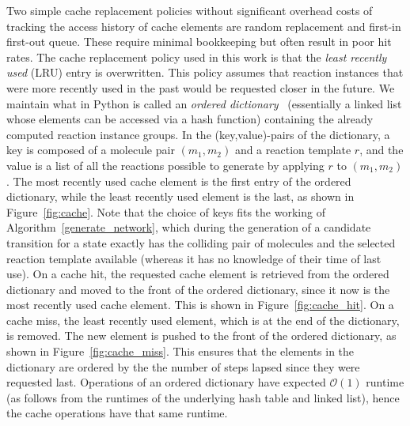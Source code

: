Two simple cache replacement policies without significant overhead costs of tracking the access history of cache elements are random replacement and first-in first-out queue. These require minimal bookkeeping but often result in poor hit rates. The cache replacement policy used in this work is that the \emph{least recently used} (LRU) entry is overwritten. This policy assumes that reaction instances that were more recently used in the past would be requested closer in the future. We maintain what in Python is called an \emph{ordered dictionary}~\cite{ordered_dict_py} (essentially a linked list whose elements can be accessed via a hash function) containing the already computed reaction instance groups. In the (key,value)-pairs of the dictionary, a key is composed of a molecule pair $(m_1,m_2)$ and a reaction template $r$, and the value is a list of all the reactions possible to generate by applying $r$ to $(m_1,m_2)$. The most recently used cache element is the first entry of the ordered dictionary, while the least recently used element is the last, as shown in Figure~\ref{fig:cache}. Note that the choice of keys fits the working of Algorithm~\ref{generate_network}, which during the generation of a candidate transition for a state exactly has the colliding pair of molecules and the selected reaction template available (whereas it has no knowledge of their time of last use). On a cache hit, the requested cache element is retrieved from the ordered dictionary and moved to the front of the ordered dictionary, since it now is the most recently used cache element. This is shown in Figure~\ref{fig:cache_hit}. On a cache miss, the least recently used element, which is at the end of the dictionary, is removed. The new element is pushed to the front of the ordered dictionary, as shown in Figure~\ref{fig:cache_miss}. This ensures that the elements in the dictionary are ordered by the the number of steps lapsed since they were requested last. Operations of an ordered dictionary have expected $\mathcal{O}(1)$ runtime (as follows from the runtimes of the underlying hash table and linked list), hence the cache operations have that same runtime.

